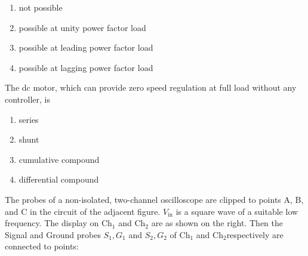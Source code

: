     \begin{enumerate}
\item not possible 
\item possible at unity power factor load 
\item possible at leading power factor load 
\item possible at lagging power factor load\\
\end{enumerate}
\item The dc motor, which can provide zero speed regulation at full load without any
controller, is 
\begin{enumerate} \item series \item shunt \item cumulative compound \item differential compound\\
\end{enumerate}
\item  The probes of a non-isolated, two-channel oscilloscope are clipped to points A, B, and C in the circuit of the adjacent figure. $V_{\text{in}}$ is a square wave of a suitable low frequency. The display on $\text{Ch}_1 $ and $\text{Ch}_2$ are as shown on the right. Then the Signal and Ground probes $ S_1, G_1 $ and $ S_2, G_2 $ of $ \text{Ch}_1 $ and $ \text{Ch}_2 $respectively are connected to points: 
		\begin{figure}[!ht]
\centering
{}%
\end{figure}

